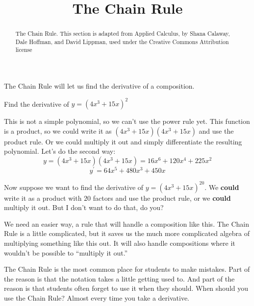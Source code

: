 \documentclass{ximera}
\title[Dig-In:]{The Chain Rule}
\begin{document}
\begin{abstract}
The Chain Rule.  This section is adapted from Applied Calculus, by Shana Calaway, Dale Hoffman, and David Lippman, used under the Creative Commons Attribution license
\end{abstract}
\maketitle

The  Chain  Rule  will  let  us  find  the  derivative  of  a  composition.  
\begin{example}
Find the derivative of $y=(4x^3+15x)^2$

This is not a simple polynomial, so we can’t use the power rule yet.  This function is a product, so we could write it as $(4x^3+15x)(4x^3+15x)$ and use the product rule.  Or we could multiply it out and simply differentiate the resulting polynomial.  Let's do the second way:
 \[ 
y=(4x^3+15x)(4x^3+15x) =16x^6+120x^4+225x^2 
\]
\[
y^{\prime}=64x^5+480x^3+450x
\]
\end{example}
Now suppose we want to find the derivative of $y=(4x^3+15x)^{20}$.  We \textbf{could} write it as a product with $20$ factors and use the product rule, or we \textbf{could} multiply it out.  But I don't want to do that, do you?

We need an easier way, a rule that will handle a composition like this.  The Chain Rule is a little complicated, but it saves us the much more complicated algebra of multiplying something like this out.  It will also handle compositions where it wouldn't be possible to ``multiply it out.''

The Chain Rule is the most common place for students to make mistakes.  Part of the reason is that the notation takes a little getting used to.  And part of the reason is that students often forget to use it when they should.  When should you use the Chain Rule?  Almost every time you take a derivative.
\end{document}
